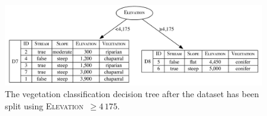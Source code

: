\documentclass[xcolor={table}]{beamer}
\newcommand{\featN}[1]{\textsc{#1}}
\begin{document}
 \begin{frame} 
\begin{table}[htb]
\caption{Partition sets (Part.), entropy, remainder (Rem.), and information gain (Info. Gain) for the candidate \featN{Elevation} thresholds: $\geq$$750$, $\geq$$1\,350$, $\geq$$2\,250$ and $\geq$$4\,175$.}
\label{tab:cont-feat-split1}
\centering
\begin{footnotesize}
\end{footnotesize}
\end{table}
\end{frame} 



 \begin{frame} 
\begin{figure}
\centerline{
	\includegraphics[width=\textwidth]{./images/ex-hand-ecology-dectree6_mod.pdf}
}
\caption{The vegetation classification decision tree after the dataset has been split using \featN{Elevation}~$\geq4\,175$.}
\label{fig:ex-hand-dectree6}
\end{figure}
\end{frame} 
\end{document}
